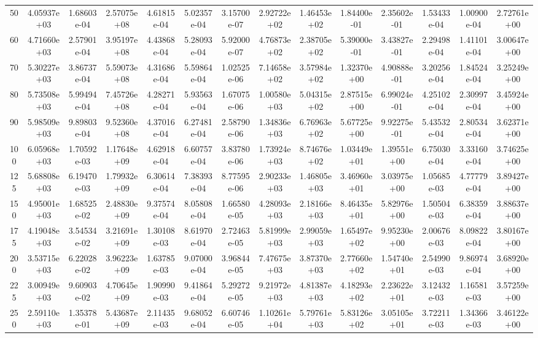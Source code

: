 \documentclass[
prb,
twocolumn,
superscriptaddress,
 amsmath,amssymb,
 aps,
longbibliography,
]{revtex4-2}
\begin{document}
\begin{table}[htbp!]
{\begin{tabular}{cccccccccccccc}
50 & 4.05937e+03 & 1.68603e-04 & 2.57075e+08 & 4.61815e-04 & 5.02357e-04 & 3.15700e-07 & 2.92722e+02 & 1.46453e+02 & 1.84400e-01 & 2.35602e-01 & 1.53433e-04 & 1.00900e-04 & 2.72761e+00 \\
60 & 4.71660e+03 & 2.57901e-04 & 3.95197e+08 & 4.43868e-04 & 5.28093e-04 & 5.92000e-07 & 4.76873e+02 & 2.38705e+02 & 5.39000e-01 & 3.43827e-01 & 2.29498e-04 & 1.41101e-04 & 3.00647e+00 \\
70 & 5.30227e+03 & 3.86737e-04 & 5.59073e+08 & 4.31686e-04 & 5.59864e-04 & 1.02525e-06 & 7.14658e+02 & 3.57984e+02 & 1.32370e+00 & 4.90888e-01 & 3.20256e-04 & 1.84524e-04 & 3.25249e+00 \\
80 & 5.73508e+03 & 5.99494e-04 & 7.45726e+08 & 4.28271e-04 & 5.93563e-04 & 1.67075e-06 & 1.00580e+03 & 5.04315e+02 & 2.87515e+00 & 6.99024e-01 & 4.25102e-04 & 2.30997e-04 & 3.45924e+00 \\
90 & 5.98509e+03 & 9.89803e-04 & 9.52360e+08 & 4.37016e-04 & 6.27481e-04 & 2.58790e-06 & 1.34836e+03 & 6.76963e+02 & 5.67725e+00 & 9.92275e-01 & 5.43532e-04 & 2.80534e-04 & 3.62371e+00 \\
100 & 6.05968e+03 & 1.70592e-03 & 1.17648e+09 & 4.62918e-04 & 6.60757e-04 & 3.83780e-06 & 1.73924e+03 & 8.74676e+02 & 1.03449e+01 &  1.39551e+00 & 6.75030e-04 & 3.33160e-04 & 3.74625e+00 \\
125 & 5.68808e+03 & 6.19470e-03 & 1.79932e+09 & 6.30614e-04 & 7.38393e-04 & 8.77595e-06 & 2.90233e+03 & 1.46805e+03 & 3.46960e+01 & 3.03975e+00 & 1.05685e-03 & 4.77779e-04 & 3.89427e+00 \\
150 & 4.95001e+03 & 1.68525e-02 & 2.48830e+09 & 9.37574e-04 & 8.05808e-04 & 1.66580e-05 & 4.28093e+03 & 2.18166e+03 & 8.46435e+01 & 5.82976e+00 & 1.50504e-03 & 6.38359e-04 & 3.88637e+00 \\
175 & 4.19048e+03 & 3.54534e-02 & 3.21691e+09 & 1.30108e-03 & 8.61970e-04 & 2.72463e-05 & 5.81999e+03 & 2.99059e+03 & 1.65497e+02 & 9.95230e+00 & 2.00676e-03 & 8.09822e-04 & 3.80167e+00 \\
200 & 3.53715e+03 & 6.22028e-02 & 3.96223e+09 & 1.63785e-03 & 9.07000e-04 & 3.96844e-05 & 7.47675e+03 & 3.87370e+03 & 2.77660e+02 & 1.54740e+01 & 2.54990e-03 & 9.86974e-04 & 3.68920e+00 \\
225 & 3.00949e+03 & 9.60903e-02 & 4.70645e+09 & 1.90990e-03 & 9.41864e-04 & 5.29272e-05 & 9.21972e+03 & 4.81387e+03 & 4.18293e+02 & 2.23622e+01 & 3.12432e-03 & 1.16581e-03 & 3.57259e+00 \\
250 & 2.59110e+03 & 1.35378e-01 & 5.43687e+09 & 2.11435e-03 & 9.68052e-04 & 6.60746e-05 & 1.10261e+04 & 5.79761e+03 & 5.83126e+02 & 3.05105e+01 & 3.72211e-03 & 1.34366e-03 & 3.46122e+00 \\

\end{tabular}}
\end{table}
\end{document}
